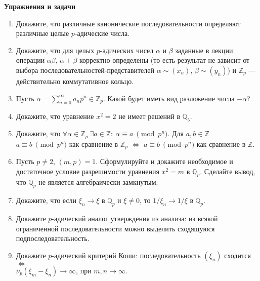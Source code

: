 \noindent\textbf{Упражнения и задачи}

\begin{enumerate}[topsep=0pt]

    \item Докажите, что различные канонические последовательности определяют различные целые $p$-адические числа. %

    \item Докажите, что для целых $p$-адических чисел $\alpha$ и $\beta$ заданные в лекции операции $\alpha \beta$, $\alpha + \beta$ корректно определены (то есть результат не зависит от выбора последовательностей-представителей $\alpha \sim (x_n)$, $\beta \sim (y_n)$) и $\mathbb{Z}_p$ --- действительно коммутативное кольцо. %

    \item Пусть $\alpha = \sum_{n=0}^{\infty} a_n p^n \in \mathbb{Z}_p$. Какой будет иметь вид разложение числа $-\alpha$? %

    \item Докажите, что уравнение $x^2=2$ не имеет решений в $\mathbb{Q}_5$.

    \item Докажите, что $\forall \alpha \in \mathbb{Z}_p\ \exists a \in \mathbb{Z}:\ \alpha \equiv a\ \pmod{p^n}$. Для $a, b \in \mathbb{Z}$ $a \equiv b\ \pmod{p^n}$ как сравнение в $\mathbb{Z}_p$ $\Leftrightarrow$ $a \equiv b\ \pmod{p^n}$ как сравнение в $\mathbb{Z}$. %


    \item Пусть $p\neq 2$, $(m,p)=1$. Сформулируйте и докажите необходимое и достаточное условие разрешимости уравнения $x^2=m$ в $\mathbb{Q}_p$. Сделайте вывод, что $\mathbb{Q}_p$ не является алгебраически замкнутым.

    \item Докажите, что если $\xi_n \rightarrow \xi$ в $\mathbb{Q}_p$ и $\xi\neq 0$, то $1 / \xi_n \rightarrow 1/\xi$ в $\mathbb{Q}_p$. %

    \item Докажите $p$-адический аналог утверждения из анализа: из всякой ограниченной последовательности можно выделить сходящуюся подпоследовательность. %

    \item Докажите $p$-адический критерий Коши: последовательность $(\xi_n)$ сходится $\Leftrightarrow$\\ ${\nu_p(\xi_m-\xi_n) \rightarrow \infty}$, при $m,n \rightarrow \infty$. %


\end{enumerate}
